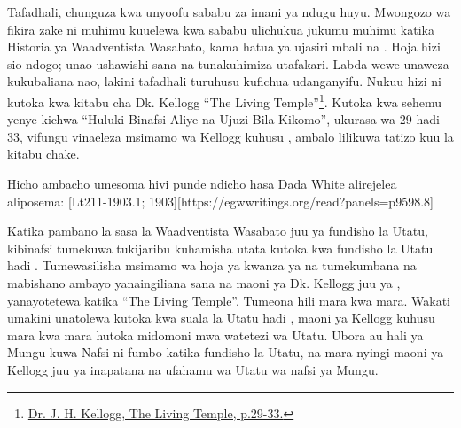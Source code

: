 Tafadhali, chunguza kwa unyoofu sababu za imani ya ndugu huyu. Mwongozo wa fikira zake ni muhimu kuuelewa kwa sababu ulichukua jukumu muhimu katika Historia ya Waadventista Wasabato, kama hatua ya ujasiri mbali na . Hoja hizi sio ndogo; unao ushawishi sana na tunakuhimiza utafakari. Labda wewe unaweza kukubaliana nao, lakini tafadhali turuhusu kufichua udanganyifu. Nukuu hizi ni kutoka kwa kitabu cha Dk. Kellogg “The Living Temple”\footnote{\href{https://archive.org/details/J.H.Kellogg.TheLivingTemple1903}{Dr. J. H. Kellogg, The Living Temple, p.29-33.}}. Kutoka kwa sehemu yenye kichwa “Huluki Binafsi Aliye na Ujuzi Bila Kikomo”, ukurasa wa 29 hadi 33, vifungu vinaeleza msimamo wa Kellogg kuhusu , ambalo lilikuwa tatizo kuu la kitabu chake.

Hicho ambacho umesoma hivi punde ndicho hasa Dada White alirejelea aliposema: [Lt211-1903.1; 1903][https://egwwritings.org/read?panels=p9598.8]

Katika pambano la sasa la Waadventista Wasabato juu ya fundisho la Utatu, kibinafsi tumekuwa tukijaribu kuhamisha utata kutoka kwa fundisho la Utatu hadi . Tumewasilisha msimamo wa hoja ya kwanza ya  na tumekumbana na mabishano ambayo yanaingiliana sana na maoni ya Dk. Kellogg juu ya , yanayotetewa katika “The Living Temple”. Tumeona hili mara kwa mara. Wakati umakini unatolewa kutoka kwa suala la Utatu hadi , maoni ya Kellogg kuhusu  mara kwa mara hutoka midomoni mwa watetezi wa Utatu. Ubora au hali ya Mungu kuwa Nafsi ni fumbo katika fundisho la Utatu, na mara nyingi maoni ya Kellogg juu ya  inapatana na ufahamu wa Utatu wa nafsi ya Mungu.

